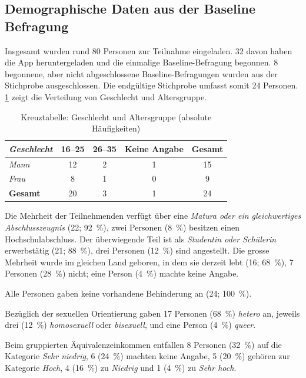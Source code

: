 \subsection*{Demographische Daten aus der Baseline Befragung}

Insgesamt wurden rund 80 Personen zur Teilnahme eingeladen. 32 davon haben die App heruntergeladen und die einmalige Baseline-Befragung begonnen. 8 begonnene, aber nicht abgeschlossene Baseline-Befragungen wurden aus der Stichprobe ausgeschlossen. Die endgültige Stichprobe umfasst somit 24 Personen. \cref{tab:kreuztabelle_abs} zeigt die Verteilung von Geschlecht und Altersgruppe.




\begin{table}[htb]
    \footnotesize
    \caption{Kreuztabelle: Geschlecht und Altersgruppe (absolute Häufigkeiten)}
    \label{tab:kreuztabelle_abs}
    \centering
    \begin{tabular}{lcccc}
        \toprule
        \emph{Geschlecht} & 16--25 & 26--35 & Keine Angabe & \multicolumn{1}{c}{Gesamt} \\
        \midrule
        \emph{Mann} & 12 & 2 & 1 & 15 \\
        \emph{Frau} &  8 & 1 & 0 &  9 \\
        \midrule
        \textbf{Gesamt} & 20 & 3 & 1 & 24 \\
    \end{tabular}
    \normalsize
\end{table}
    
  

Die Mehrheit der Teilnehmenden verfügt über eine \emph{Matura oder ein gleichwertiges Abschlusszeugnis} (22; 92~\%), zwei Personen (8~\%) besitzen einen Hochschulabschluss. Der überwiegende Teil ist als \emph{Student\genderstern in oder Schüler\genderstern in} erwerbstätig (21; 88~\%), drei Personen (12~\%) sind angestellt. Die grosse Mehrheit wurde im gleichen Land geboren, in dem sie derzeit lebt (16; 68~\%), 7 Personen (28~\%) nicht; eine Person (4~\%) machte keine Angabe.

Alle Personen gaben keine vorhandene Behinderung an (24; 100~\%).

Bezüglich der sexuellen Orientierung gaben 17 Personen (68~\%) \emph{hetero} an, jeweils drei (12~\%) \emph{homosexuell} oder \emph{bisexuell}, und eine Person (4~\%) \emph{queer}.

Beim gruppierten Äquivalenzeinkommen entfallen 8 Personen (32~\%) auf die Kategorie \emph{Sehr niedrig}, 6 (24~\%) machten keine Angabe, 5 (20~\%) gehören zur Kategorie \emph{Hoch}, 4 (16~\%) zu \emph{Niedrig} und 1 (4~\%) zu \emph{Sehr hoch}.

